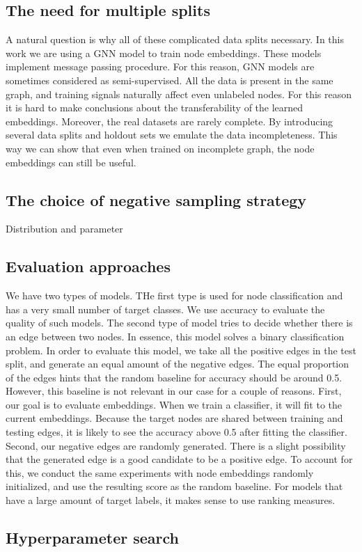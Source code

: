 \documentclass[a4paper,twoside]{article}
\begin{document}
\subsection{The need for multiple splits}

A natural question is why all of these complicated data splits necessary. In this work we are using a GNN model to train node embeddings. These models implement message passing procedure. For this reason, GNN models are sometimes considered as semi-supervised. All the data is present in the same graph, and training signals naturally affect even unlabeled nodes. For this reason it is hard to make conclusions about the transferability of the learned embeddings. Moreover, the real datasets are rarely complete. By introducing several data splits and holdout sets we emulate the data incompleteness. This way we can show that even when trained on incomplete graph, the node embeddings can still be useful.

\subsection{The choice of negative sampling strategy}

Distribution and parameter

\subsection{Evaluation approaches}

We have two types of models. THe first type is used for node classification and has a very small number of target classes. We use accuracy to evaluate the quality of such models. The second type of model tries to decide whether there is an edge between two nodes. In essence, this model solves a binary classification problem. In order to evaluate this model, we take all the positive edges in the test split, and generate an equal amount of the negative edges. The equal proportion of the edges hints that the random baseline for accuracy should be around 0.5. However, this baseline is not relevant in our case for a couple of reasons. First, our goal is to evaluate embeddings. When we train a classifier, it will fit to the current embeddings. Because the target nodes are shared between training and testing edges, it is likely to see the accuracy above 0.5 after fitting the classifier. Second, our negative edges are randomly generated. There is a slight possibility that the generated edge is a good candidate to be a positive edge. To account for this, we conduct the same experiments with node embeddings randomly initialized, and use the resulting score as the random baseline.
For models that have a large amount of target labels, it makes sense to use ranking measures. 

\subsection{Hyperparameter search}



{\small
}
\end{document}
